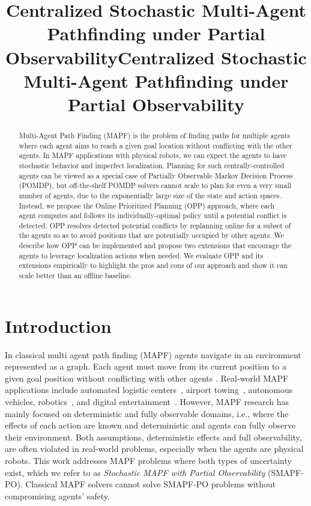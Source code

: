 \documentclass[letterpaper]{article}
\title{Centralized Stochastic Multi-Agent Pathfinding under Partial Observability}
\begin{document}
\maketitle

\title{Centralized Stochastic Multi-Agent Pathfinding under Partial Observability}



\begin{abstract}
Multi-Agent Path Finding (MAPF) is the problem of finding paths for multiple agents where each agent aims to reach a given goal location without conflicting with the other agents.
In MAPF applications with physical robots, we can expect the agents to have stochastic behavior and imperfect localization.
Planning for such centrally-controlled agents can be viewed as a special case of Partially Observable Markov Decision Process (POMDP), but off-the-shelf POMDP solvers cannot scale to plan for even a very small number of agents, due to the exponentially large size of the state and action spaces.
Instead, we propose the Online Prioritized Planning (OPP) approach, where each agent computes and follows its individually-optimal policy until a potential conflict is detected.
OPP resolves detected potential conflicts by replanning online for a subset of the agents so as to avoid positions that are potentially occupied by other agents.
We describe how OPP can be implemented and propose two extensions that encourage the agents to leverage localization actions when needed.
We evaluate OPP and its extensions empirically to highlight the pros and cons of our approach and show it can scale better than an offline baseline.
\end{abstract}




\section{Introduction}

In classical multi agent path finding (MAPF) agents navigate in an environment represented as a graph.  Each agent must move from its current position to a given goal position without conflicting with other agents \cite{stern2019mapf}.
Real-world MAPF applications include automated logistic centers~\cite{wurman2008coordinating,salzman2020research}, airport towing~\cite{morris2016planning}, autonomous vehicles, robotics~\cite{veloso2015cobots}, and digital entertainment~\cite{ma2017feasibility}. However, MAPF research has mainly focused on deterministic and fully observable domains, i.e., where the effects of each action are known and deterministic and agents can fully observe their environment.
Both assumptions, deterministic effects and full observability, are often violated in real-world problems, especially when the agents are physical robots.
This work addresses MAPF problems where both types of uncertainty exist, which we refer to as \emph{Stochastic MAPF with Partial Observability} (SMAPF-PO).
Classical MAPF solvers cannot solve SMAPF-PO problems without compromising agents' safety.
\end{document}

